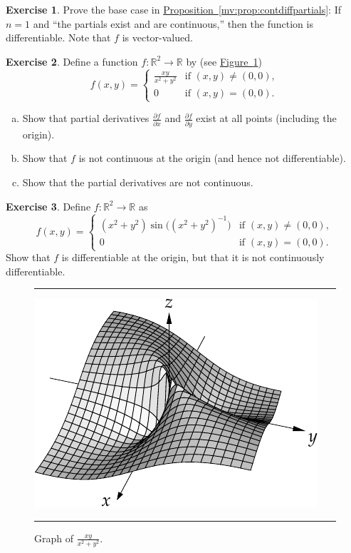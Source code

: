 \documentclass[12pt,openany]{book}
\newcommand{\R}{{\mathbb{R}}}
\newcommand{\myquote}[1]{``#1''}
\theoremstyle{plain}
\theoremstyle{remark}
\theoremstyle{definition}
\newenvironment{exbox}{%
    \def\FrameCommand{\vrule width 1pt \relax\hspace{10pt}}%
    \MakeFramed{\advance\hsize-\width\FrameRestore}%
}{%
    \endMakeFramed
}
\newenvironment{exparts}{%
    \leavevmode\begin{enumerate}[a),noitemsep,topsep=0pt,parsep=0pt,partopsep=0pt]
}{%
    \end{enumerate}
}
\newenvironment{myfig}{%
\begin{figure}[h!t]
\noindent\rule{\textwidth}{0.5pt}\vspace{12pt}\par\centering}%
{\par\noindent\rule{\textwidth}{0.5pt}
\end{figure}}
\theoremstyle{exercise}
\newtheorem{exercise}{Exercise}[section]
\theoremstyle{example}
\newcommand{\figureref}[1]{\hyperref[#1]{Figure~\ref*{#1}}}
\newcommand{\propref}[1]{\hyperref[#1]{Proposition~\ref*{#1}}}
\begin{document}
\begin{exbox}
\begin{exercise}
Prove the base case
in \propref{mv:prop:contdiffpartials}:
If $n=1$ and 
\myquote{the partials exist and are continuous,} then the function is 
differentiable.  Note that $f$ is vector-valued.
\end{exercise}

\begin{exercise}
Define a function $f \colon \R^2 \to \R$ by
(see \figureref{fig:xyxsqysqvol2})
\begin{equation*}
f(x,y)
=
\begin{cases}
\frac{xy}{x^2+y^2} & \text{if } (x,y) \not= (0,0), \\
0 & \text{if } (x,y) = (0,0).
\end{cases}
\end{equation*}
\begin{exparts}
\item
Show that partial derivatives 
$\frac{\partial f}{\partial x}$ and
$\frac{\partial f}{\partial y}$ exist at all points (including the origin).
\item
Show that $f$ is not continuous at the origin (and hence not
differentiable).
\item
Show that the partial derivatives are not continuous.
\end{exparts}
\end{exercise}

\begin{exercise}
Define $f \colon \R^2 \to \R$ as
\begin{equation*}
f(x,y) =
\begin{cases}
(x^2+y^2)\sin\bigl({(x^2+y^2)}^{-1}\bigr) & \text{if } (x,y) \not= (0,0), \\
0 & \text{if } (x,y) = (0,0).
\end{cases}
\end{equation*}
Show that $f$ is differentiable at the origin, but that it is not 
continuously differentiable.
\end{exercise}
\end{exbox}

\begin{myfig}
\includegraphics{figures/xyxsqysq}
\caption{Graph of $\frac{xy}{x^2+y^2}$.\label{fig:xyxsqysqvol2}}
\end{myfig}
\end{document}
